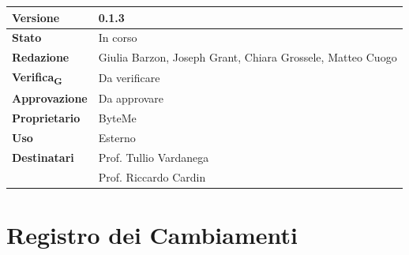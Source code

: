 \documentclass[11pt,a4paper]{article}
\newcommand{\gls}[1]{#1\textsubscript{G}}
\begin{document}
\begin{titlepage}
    \begin{table}[H]
        \centering
        \begin{tabular}{|l|p{5cm}|}
            \hline
            \textbf{Versione} & 0.1.3 \\
            \hline
            \textbf{Stato} & In corso \\
            \hline
            \textbf{Redazione} & Giulia Barzon, Joseph Grant, Chiara Grossele, Matteo Cuogo \\
            \hline
            \textbf{\gls{Verifica}} & Da verificare\\
            \hline
            \textbf{Approvazione} & Da approvare\\
            \hline
            \textbf{Proprietario} & ByteMe \\
            \hline
            \textbf{Uso} & Esterno \\
            \hline
            \textbf{Destinatari} & Prof. Tullio Vardanega \\ & Prof. Riccardo Cardin \\
            \hline
        \end{tabular}
    \end{table}
    
    \vfill
\end{titlepage}

\thispagestyle{empty}
\section*{Registro dei Cambiamenti}
\end{document}
